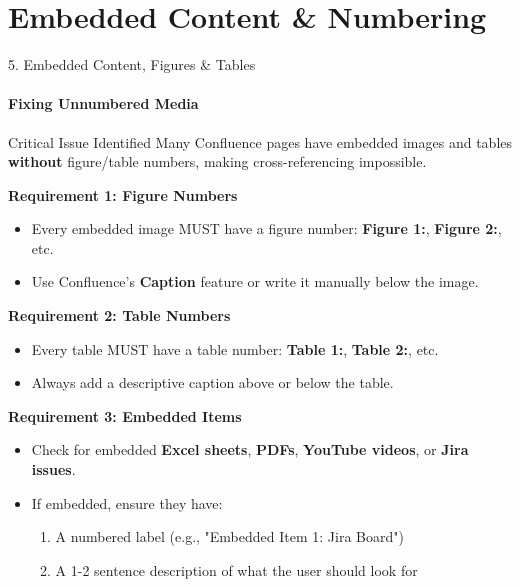 \documentclass[10pt, aspectratio=169]{beamer}
\begin{document}
	\section{Embedded Content \& Numbering}
	\begin{frame}[fragile]{5. Embedded Content, Figures \& Tables}
		\framesubtitle{Fixing Unnumbered Media}
		\begin{block}{Critical Issue Identified}
			Many Confluence pages have embedded images and tables \textbf{without} figure/table numbers, making cross-referencing impossible.
		\end{block}
		
		\pause
		\textbf{Requirement 1: Figure Numbers}
		\begin{itemize}
			\item Every embedded image MUST have a figure number: \textbf{Figure 1:}, \textbf{Figure 2:}, etc.
			\item Use Confluence's \textbf{Caption} feature or write it manually below the image.
		\end{itemize}
		\pause
		
		\textbf{Requirement 2: Table Numbers}
		\begin{itemize}
			\item Every table MUST have a table number: \textbf{Table 1:}, \textbf{Table 2:}, etc.
			\item Always add a descriptive caption above or below the table.
		\end{itemize}
		\pause
		
		\textbf{Requirement 3: Embedded Items}
		\begin{itemize}
			\item Check for embedded \textbf{Excel sheets}, \textbf{PDFs}, \textbf{YouTube videos}, or \textbf{Jira issues}.
			\item If embedded, ensure they have:
			\begin{enumerate}
				\item A numbered label (e.g., "Embedded Item 1: Jira Board")
				\item A 1-2 sentence description of what the user should look for
			\end{enumerate}
		\end{itemize}
	\end{frame}
	
\end{document}
